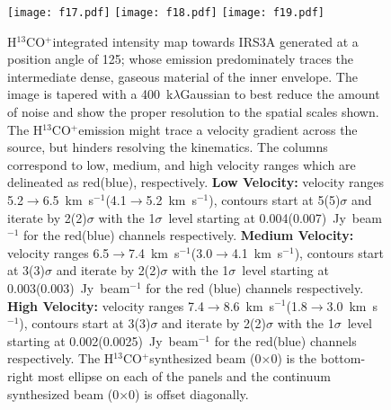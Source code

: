 \documentclass[twocolumn, 12pt]{aastex63}
\newcommand{\htcop}{H$^{13}$CO$^+$}
\renewcommand{\deg}{\degr}
\newcommand{\kms}{km~s$^{-1}$}
\newcommand{\htcopbeam}{0\farcs85$\times$0\farcs52}
\newcommand{\contbeam}{0\farcs11$\times$0\farcs05}
\begin{document}
\begin{figure}[H]
\begin{center}
   \texttt{[image: f17.pdf]}
   \texttt{[image: f18.pdf]}
   \texttt{[image: f19.pdf]}
\end{center}
   \caption{\htcop\space integrated intensity map towards IRS3A generated at a position angle of 125\deg; whose emission predominately traces the intermediate dense, gaseous material of the inner envelope. The image is tapered with a 400~k$\lambda$\space Gaussian to best reduce the amount of noise and show the proper resolution to the spatial scales shown. The \htcop\space emission might trace a velocity gradient across the source, but  hinders resolving the kinematics. The columns correspond to low, medium, and high velocity ranges which are delineated as red(blue), respectively. \textbf{Low Velocity:} velocity ranges 5.2$\rightarrow$6.5~\kms (4.1$\rightarrow$5.2~\kms), contours start at 5(5)$\sigma$ and iterate by 2(2)$\sigma$ with the 1$\sigma$~level starting at 0.004(0.007)~Jy~beam$^{-1}$ for the red(blue) channels respectively. \textbf{Medium Velocity:}  velocity ranges 6.5$\rightarrow$7.4~\kms (3.0$\rightarrow$4.1~\kms), contours start at 3(3)$\sigma$ and iterate by 2(2)$\sigma$ with the 1$\sigma$~level starting at 0.003(0.003)~Jy~beam$^{-1}$ for the red (blue) channels respectively. \textbf{High Velocity:} velocity ranges 7.4$\rightarrow$8.6~\kms (1.8$\rightarrow$3.0~\kms), contours start at 3(3)$\sigma$ and iterate by 2(2)$\sigma$ with the 1$\sigma$~level starting at 0.002(0.0025)~Jy~beam$^{-1}$ for the red(blue) channels respectively. The \htcop\space synthesized beam (\htcopbeam) is the bottom-right most ellipse on each of the panels and the continuum synthesized beam (\contbeam) is offset diagonally.}\label{fig:irs3ah13copmoment}
\end{figure}
\end{document}
